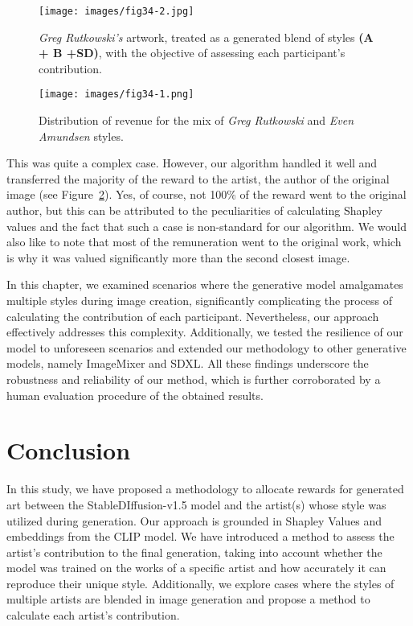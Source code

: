\documentclass[12pt, letterpaper]{article}
\begin{document}
\begin{figure}[h]
    \centering
    \texttt{[image: images/fig34-2.jpg]}
    \caption{\textit{Greg Rutkowski's} artwork, treated as a generated blend of styles \textbf{(A + B +SD)}, with the objective of assessing each participant's contribution.}
    \label{fig34:second_image}
\end{figure}

\begin{figure}[h]
    \centering
    \texttt{[image: images/fig34-1.png]}
    \caption{Distribution of revenue for the mix of \textit{Greg Rutkowski} and \textit{Even Amundsen} styles.}
    \label{fig34:first_image}
\end{figure}

This was quite a complex case. However, our algorithm handled it well and transferred the majority of the reward to the artist, the author of the original image (see Figure~\ref{fig34:first_image}). Yes, of course, not 100\% of the reward went to the original author, but this can be attributed to the peculiarities of calculating Shapley values and the fact that such a case is non-standard for our algorithm. We would also like to note that most of the remuneration went to the original work, which is why it was valued significantly more than the second closest image.

In this chapter, we examined scenarios where the generative model amalgamates multiple styles during image creation, significantly complicating the process of calculating the contribution of each participant. Nevertheless, our approach effectively addresses this complexity. Additionally, we tested the resilience of our model to unforeseen scenarios and extended our methodology to other generative models, namely ImageMixer and SDXL. All these findings underscore the robustness and reliability of our method, which is further corroborated by a human evaluation procedure of the obtained results.


\section{Conclusion}
In this study, we have proposed a methodology to allocate rewards for generated art between the StableDIffusion-v1.5 model and the artist(s) whose style was utilized during generation. Our approach is grounded in Shapley Values and embeddings from the CLIP model. We have introduced a method to assess the artist's contribution to the final generation, taking into account whether the model was trained on the works of a specific artist and how accurately it can reproduce their unique style. Additionally, we explore cases where the styles of multiple artists are blended in image generation and propose a method to calculate each artist's contribution.
\end{document}
